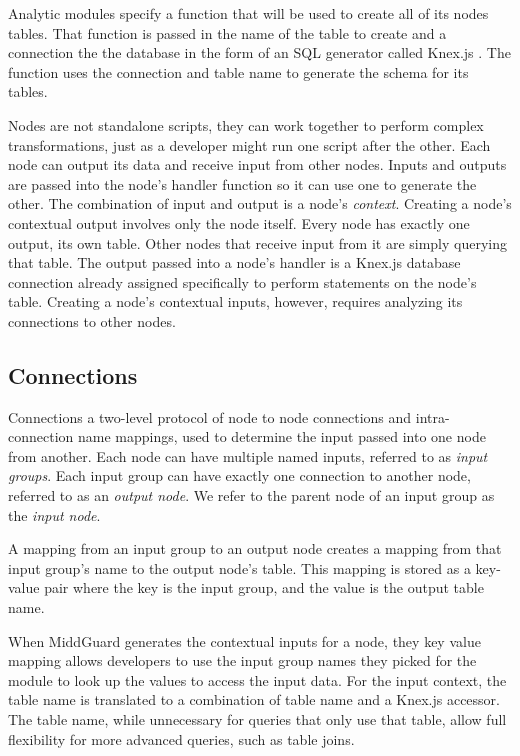 \documentclass[midd]{thesis}
\begin{document}
Analytic modules specify a function that will be used to create all of its nodes
tables. That function is passed in the name of the table to create and a
connection the the database in the form of an SQL generator called Knex.js
\cite{knexjs}. The function uses the connection and table name to generate the
schema for its tables.

Nodes are not standalone scripts, they can work together to perform complex
transformations, just as a developer might run one script after the other. Each
node can output its data and receive input from other nodes. Inputs and outputs
are passed into the node's handler function so it can use one to generate the
other. The combination of input and output is a node's \textit{context}.
Creating a node's contextual output involves only the node itself. Every node
has exactly one output, its own table. Other nodes that receive input from it
are simply querying that table. The output passed into a node's handler is a
Knex.js database connection already assigned specifically to perform statements
on the node's table. Creating a node's contextual inputs, however, requires
analyzing its connections to other nodes.

\subsection{Connections}

Connections a two-level protocol of node to node connections and
intra-connection name mappings, used to determine the input passed into one node
from another. Each node can have multiple named inputs, referred to as
\textit{input groups}. Each input group can have exactly one connection to
another node, referred to as an \textit{output node}. We refer to the parent
node of an input group as the \textit{input node}.

A mapping from an input group to an output node creates a mapping from that
input group's name to the output node's table. This mapping is stored as a
key-value pair where the key is the input group, and the value is the output
table name.

When MiddGuard generates the contextual inputs for a node, they key value
mapping allows developers to use the input group names they picked for the
module to look up the values to access the input data. For the input context,
the table name is translated to a combination of table name and a Knex.js
accessor. The table name, while unnecessary for queries that only use that
table, allow full flexibility for more advanced queries, such as table joins.
\end{document}
